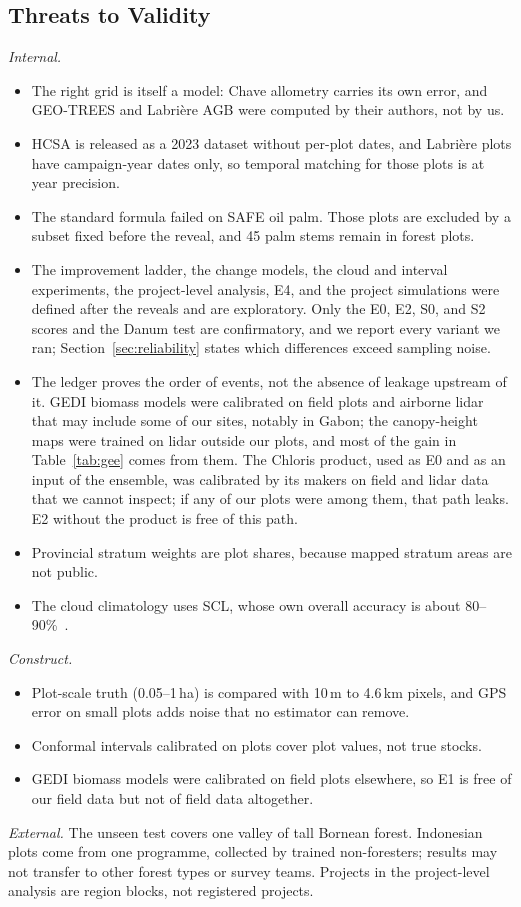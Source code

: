 \documentclass[conference,a4paper]{IEEEtran}
\begin{document}
\subsection{Threats to Validity}
\emph{Internal.}
\begin{itemize}
\item The right grid is itself a model: Chave allometry carries its own error, and GEO-TREES and Labri\`ere AGB were computed by their authors, not by us.
\item HCSA is released as a 2023 dataset without per-plot dates, and Labri\`ere plots have campaign-year dates only, so temporal matching for those plots is at year precision.
\item The standard formula failed on SAFE oil palm. Those plots are excluded by a subset fixed before the reveal, and 45 palm stems remain in forest plots.
\item The improvement ladder, the change models, the cloud and interval experiments, the project-level analysis, E4, and the project simulations were defined after the reveals and are exploratory. Only the E0, E2, S0, and S2 scores and the Danum test are confirmatory, and we report every variant we ran; Section~\ref{sec:reliability} states which differences exceed sampling noise.
\item The ledger proves the order of events, not the absence of leakage upstream of it. GEDI biomass models were calibrated on field plots and airborne lidar that may include some of our sites, notably in Gabon; the canopy-height maps were trained on lidar outside our plots, and most of the gain in Table~\ref{tab:gee} comes from them. The Chloris product, used as E0 and as an input of the ensemble, was calibrated by its makers on field and lidar data that we cannot inspect; if any of our plots were among them, that path leaks. E2 without the product is free of this path.
\item Provincial stratum weights are plot shares, because mapped stratum areas are not public.
\item The cloud climatology uses SCL, whose own overall accuracy is about 80--90\%~\cite{skakun2022cmix}.
\end{itemize}
\emph{Construct.}
\begin{itemize}
\item Plot-scale truth (0.05--1\,ha) is compared with 10\,m to 4.6\,km pixels, and GPS error on small plots adds noise that no estimator can remove.
\item Conformal intervals calibrated on plots cover plot values, not true stocks.
\item GEDI biomass models were calibrated on field plots elsewhere, so E1 is free of our field data but not of field data altogether.
\end{itemize}
\emph{External.} The unseen test covers one valley of tall Bornean forest. Indonesian plots come from one programme, collected by trained non-foresters; results may not transfer to other forest types or survey teams. Projects in the project-level analysis are region blocks, not registered projects.
\end{document}
